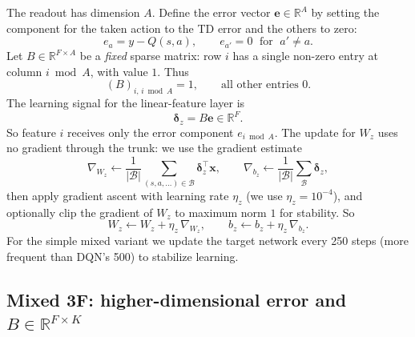 \documentclass[11pt]{article}
\begin{document}
The readout has dimension $A$. Define the error vector $\mathbf{e} \in \mathbb{R}^A$ by setting the component for the taken action to the TD error and the others to zero:
\begin{equation}
e_a = y - Q(s,a), \qquad e_{a'} = 0 \;\text{ for }\; a' \neq a.
\end{equation}
Let $B \in \mathbb{R}^{F \times A}$ be a \emph{fixed} sparse matrix: row $i$ has a single non-zero entry at column $i \bmod A$, with value $1$. Thus
\begin{equation}
(B)_{i,\, i \bmod A} = 1, \qquad \text{all other entries } 0.
\end{equation}
The learning signal for the linear-feature layer is
\begin{equation}
\boldsymbol{\delta}_z = B \mathbf{e} \in \mathbb{R}^F.
\end{equation}
So feature $i$ receives only the error component $e_{i \bmod A}$. The update for $W_z$ uses no gradient through the trunk: we use the gradient estimate
\begin{equation}
\nabla_{W_z} \leftarrow \frac{1}{|\mathcal{B}|} \sum_{(s,a,\ldots) \in \mathcal{B}} \boldsymbol{\delta}_z^{\top} \mathbf{x}, \qquad \nabla_{b_z} \leftarrow \frac{1}{|\mathcal{B}|} \sum_{\mathcal{B}} \boldsymbol{\delta}_z,
\end{equation}
then apply gradient ascent with learning rate $\eta_z$ (we use $\eta_z = 10^{-4}$), and optionally clip the gradient of $W_z$ to maximum norm $1$ for stability. So
\begin{equation}
W_z \leftarrow W_z + \eta_z\,\nabla_{W_z}, \qquad b_z \leftarrow b_z + \eta_z\,\nabla_{b_z}.
\end{equation}
For the simple mixed variant we update the target network every 250 steps (more frequent than DQN's 500) to stabilize learning.

\subsection{Mixed 3F: higher-dimensional error and $B \in \mathbb{R}^{F \times K}$}
\end{document}
